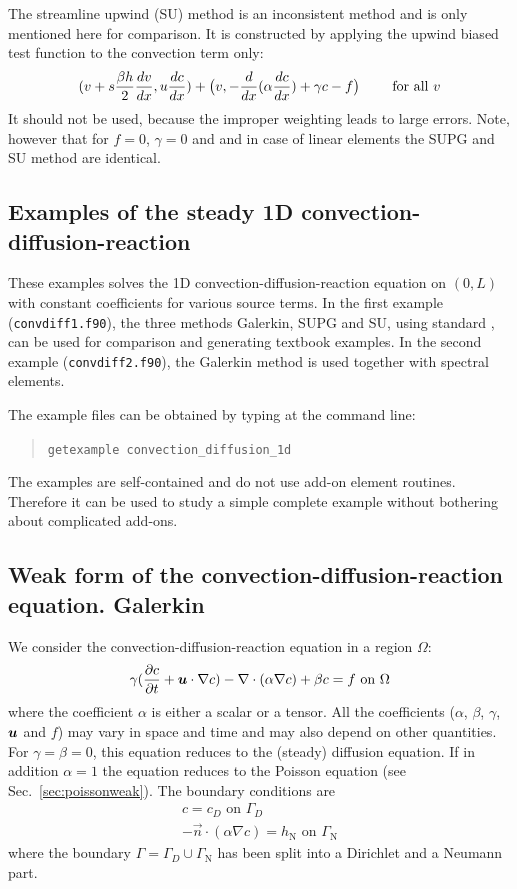 The streamline upwind (SU) method is an inconsistent method and is only
mentioned here for comparison. It is constructed by applying
the upwind biased test function to
the convection term only:
\begin{equation}
   (v+s\dfrac{\beta h}2 \dfrac{d v}{d x},u \dfrac{d c}{d x}) +\big(v, -
\dfrac{d }{d x}(\alpha\dfrac{d c}{d x}) + \gamma c - f\big)\qquad
  \text{ for all }v
\end{equation}
It should not be used, because the improper weighting leads to large errors.
Note, however that for $f=0$, $\gamma=0$ and and in case of
linear elements the SUPG and SU
method are identical.

\subsection{Examples of the steady 1D convection-diffusion-reaction}
\label{sec:examples1dconvdiff}

These examples solves the 1D convection-diffusion-reaction equation on $(0,L)$
with constant coefficients for various source terms. 
In the first example (\texttt{convdiff1.f90}), the three methods Galerkin,
SUPG and SU, using standard \fem, can be used for comparison and generating textbook examples.
In the second example (\texttt{convdiff2.f90}), the Galerkin method is used together
with spectral elements.

The example files can be obtained by typing at the
command line:
\medskip
\begin{quote}
   \texttt{getexample convection\_diffusion\_1d}
\end{quote}
The examples are self-contained and do not use add-on element routines.
Therefore it can be used to study a simple complete example without bothering
about complicated add-ons.

\subsection{Weak form of the convection-diffusion-reaction
equation. Galerkin \fem}
\label{sec:diffusionweak}

We consider the convection-diffusion-reaction equation in a region $\Omega$:
\begin{equation}
    \gamma(\dfrac{\partial c}{\partial t} + \boldsymbol{u}\cdot\nabla c) -\nabla \cdot( \alpha \nabla c)
+ \beta c = f\text{ on }\Omega
 \label{eq:convectiondiffusion}
\end{equation}
where the coefficient $\alpha$ is either a scalar or a tensor. All the
coefficients ($\alpha$, $\beta$, $\gamma$, $\boldsymbol{u}$ and $f$) may vary in
space and time and may also depend on other quantities.
For $\gamma=\beta=0$, this equation reduces to
the (steady) diffusion equation.
If in addition $\alpha=1$ the equation reduces to
the Poisson equation (see Sec.~\ref{sec:poissonweak}).
The boundary conditions are
\begin{gather}
    c = c_D\text{ on }\Gamma_D\\
    -\vec n\cdot(\alpha\nabla c)=h_{\text{N}}\text{ on }\Gamma_{\text{N}}
\end{gather}
where the boundary $\Gamma=\Gamma_D\cup\Gamma_{\text{N}}$ has been split into a
Dirichlet and a Neumann part.

